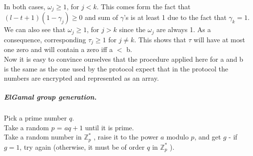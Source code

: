 \documentclass[11pt, a4paper, oneside, openright]{book} %
\begin{document}
In both cases, $\omega_{j} \geq 1$, for $j < k$. This comes form the fact that $(l-t+1)(1-\gamma _j) \geq  0$ and sum of $\gamma$'s is at least 1 due to the fact that $\gamma _k=1$. We can also see that $\omega_{j} \geq 1$, for $j > k$ since the $\omega _j$ are always 1.
As a consequence, corresponding $\tau _j \geq 1$ for $j \neq k$.  
This shows that $\tau$ will have at most one zero and will contain a zero iff a $<$ b. \\  
Now it is easy to convince ourselves that the procedure applied here for a and b is the same as the one used by the protocol expect that in the protocol the numbers are encrypted and represented as an array. 

\subparagraph{ElGamal group generation.}

Pick a prime number $q$.\\
 Take a random $p$ = $aq + 1$ until it is prime.\\
 Take a random number in $\mathbb{Z}_ p^*$ , raise it to the power $a$ modulo $p$,
and get $g$
- if $g = 1$, try again (otherwise, it must be of order $q$ in $\mathbb{Z}_p^*$ ). 
\end{document}
